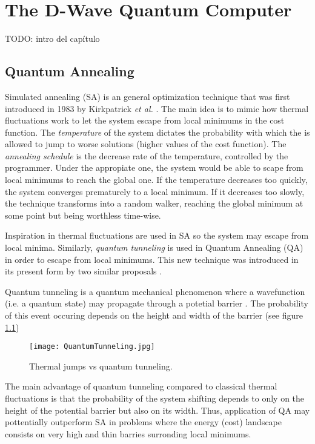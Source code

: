 \chapter{The D-Wave Quantum Computer}


TODO: intro del capítulo


\section{Quantum Annealing}


Simulated annealing (SA) is an general optimization technique that was first introduced in 1983 by Kirkpatrick \emph{et al.} \cite{Kirkpatrick1983}. The main idea is to mimic how thermal fluctuations work to let the system escape from local minimums in the cost function. The \emph{temperature} of the system dictates the probability with which the is allowed to jump to worse solutions (higher values of the cost function). The \emph{annealing schedule} is the decrease rate of the temperature, controlled by the programmer. Under the appropiate one, the system would be able to scape from local minimums to reach the global one. If the temperature decreases too quickly, the system converges prematurely to a local minimum. If it decreases too slowly, the technique transforms into a random walker, reaching the global minimum at some point but being worthless time-wise.

Inspiration in thermal fluctuations are used in SA so the system may escape from local minima. Similarly, \emph{quantum tunneling} is used in Quantum Annealing (QA) in order to escape from local minimums. This new technique was introduced in its present form by two similar proposals \cite{Finnila1994} \cite{Kadowaki1998}.

Quantum tunneling is a quantum mechanical phenomenon where a wavefunction (i.e. a quantum state) may propagate through a potetial barrier \cite{Nimtz2008}. The probability of this event occuring depends on the height and width of the barrier (see figure \ref{fig 2.1})

\begin{figure}[h]
	\texttt{[image: QuantumTunneling.jpg]}
	\centering
	\caption{Thermal jumps vs quantum tunneling.}
	\label{fig 2.1}
\end{figure}

The main advantage of quantum tunneling compared to classical thermal fluctuations is that the probability of the system shifting depends to only on the height of the potential barrier but also on its width. Thus, application of QA may pottentially outperform SA in problems where the energy (cost) landscape consists on very high and thin barries surronding local minimums. 

